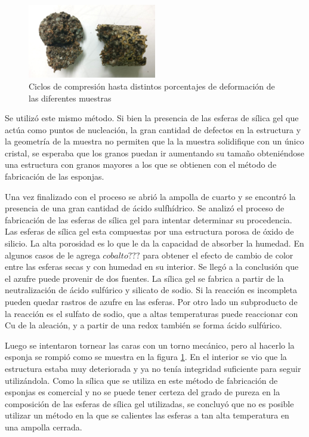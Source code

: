 \documentclass[a4paper,12pt,fleqn,twoside,openany]{book}
\begin{document}
 \begin{figure}[h]
 \centering
 \includegraphics[width=0.5\textwidth]{Img/Resultados/EspRota.jpg}
 \caption{Ciclos de compresión hasta distintos porcentajes de deformación de las diferentes muestras  } 
 \label{fig: EspRota}
 \end{figure}

Se utilizó este mismo método. Si bien la presencia de las esferas de sílica gel que actúa como puntos de nucleación, la gran cantidad de defectos en la estructura y la geometría de la muestra no permiten que la la muestra solidifique con un único cristal, se esperaba que los granos puedan ir aumentando su tamaño obteniéndose una estructura con granos mayores a los que se obtienen con el método de fabricación de las esponjas. 

Una vez finalizado con el proceso se abrió la ampolla de cuarto y se encontró la presencia de una gran cantidad de ácido sulfhídrico. Se analizó el proceso de fabricación de las esferas de sílica gel para intentar determinar su procedencia. Las esferas de sílica gel esta compuestas por una estructura porosa de óxido de silicio. La alta porosidad es lo que le da la capacidad de absorber la humedad. En algunos casos de le agrega $cobalto???$ para obtener el efecto de cambio de color entre las esferas secas y con humedad en su interior. Se llegó a la conclusión que el azufre puede provenir de dos fuentes. La sílica gel se fabrica a partir de la neutralización de ácido sulfúrico y silicato de sodio. Si la reacción es incompleta pueden quedar rastros de azufre en las esferas. Por otro lado un subproducto de la reacción es el sulfato de sodio, que a altas temperaturas puede reaccionar con Cu de la aleación, y a partir de una redox también se forma ácido sulfúrico. 

Luego se intentaron tornear las caras con un torno mecánico, pero al hacerlo la esponja se rompió como se muestra en la figura \ref{fig: EspRota}. En el interior se vio que la estructura estaba muy deteriorada y ya no tenía integridad suficiente para seguir utilizándola. Como la sílica que se utiliza en este método de fabricación de esponjas es comercial y no se puede tener certeza del grado de pureza en la composición de las esferas de sílica gel utilizadas, se concluyó que no es posible utilizar un método en la que se calientes las esferas a tan alta temperatura en una ampolla cerrada. 
\end{document}
